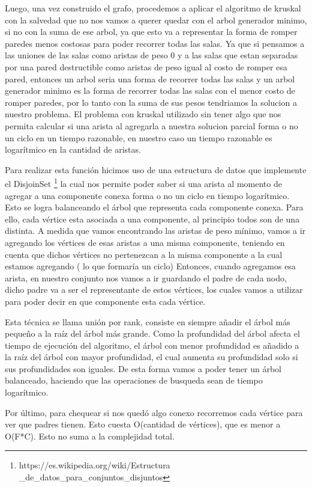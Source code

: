 Luego, una vez construido el grafo, procedemos a aplicar el algoritmo de kruskal con la salvedad que no nos vamos a querer quedar con el arbol generador minimo, si no con la suma de ese arbol, ya que esto va a representar la forma de romper paredes menos costosas para poder recorrer todas las salas. Ya que si pensamos a las uniones de las salas como aristas de peso 0 y a las salas que estan separadas por una pared destructible como aristas de peso igual al costo de romper esa pared, entonces un arbol seria una forma de recorrer todas las salas y un arbol generador minimo es la forma de recorrer todas las salas con el menor costo de romper paredes, por lo tanto con la suma de sus pesos tendriamos la solucion a nuestro problema. 
El problema con kruskal utilizado sin tener algo que nos permita calcular si una arista al agregarla a nuestra solucion parcial forma o no un ciclo en un tiempo razonable, en nuestro caso un tiempo razonable es logarítmico en la cantidad de aristas.

Para realizar esta función hicimos uso de una estructura de datos que implemente el DisjoinSet
\footnote{https://es.wikipedia.org/wiki/Estructura
\_de\_datos\_para\_conjuntos\_disjuntos} la cual nos permite poder
saber si una arista al momento de agregar a una componente conexa forma o no un ciclo en tiempo logarítmico.
Esto se logra balanceando el árbol que representa cada componente conexa. Para ello, cada vértice esta asociada a una componente, al principio todos son de una distinta.
A medida que vamos encontrando las aristas de peso mínimo, vamos a ir agregando los vértices de esas aristas a una misma componente, teniendo en cuenta que dichos vértices no pertenezcan a la misma componente a la cual estamos agregando ( lo que formaría un ciclo)
Entonces, cuando agregamos esa arista, en nuestro conjunto nos vamos a ir guardando el padre de cada nodo, dicho padre va a ser el representante de estos vértices, los cuales vamos a utilizar para poder decir en que componente esta cada vértice.

Esta técnica se llama unión por rank, consiste en siempre añadir el árbol más pequeño a la raíz del árbol más grande. Como la profundidad del árbol afecta el tiempo de ejecución del algoritmo, el árbol con menor profundidad es añadido a la raíz del árbol con mayor profundidad, el cual aumenta su profundidad solo si sus profundidades son iguales. 
De esta forma vamos a poder tener un árbol balanceado, haciendo que las operaciones de busqueda sean de tiempo logarítmico.

Por último, para chequear si nos quedó algo conexo recorremos cada vértice para ver que padres tienen. Esto cuesta O(cantidad de vértices), que es menor a O(F*C). Esto no suma a la complejidad total. 

